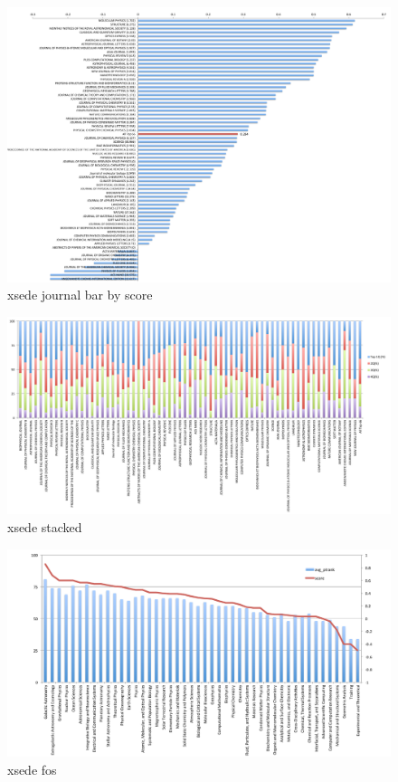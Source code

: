 \documentclass{sig-alternate}
\begin{document}
\begin{figure}[htb] 
  \centering 
    \includegraphics[width=1.0\textwidth]{images-new/xsede-journal-bar-by-score.pdf} 
  \caption{xsede journal bar by score}\label{F:xsede-score} 
\end{figure} 

\begin{figure}[htb] 
  \centering 
    \includegraphics[width=1.0\textwidth]{images-new/xsede-journal-stacked.pdf} 
  \caption{xsede stacked}\label{F:xsede-stacked} 
\end{figure} 

\begin{figure}[htb] 
  \centering 
    \includegraphics[width=1.0\textwidth]{images-new/xsede-vs-peers-by-fos.pdf} 
  \caption{xsede fos}\label{F:xsede-fos} 
\end{figure} 
\end{document}

